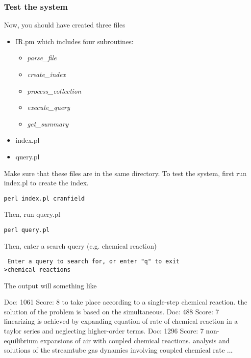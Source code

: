 \subsubsection{Test the system}

Now, you should have created three files
\begin{itemize}
  \item IR.pm which includes four subroutines:
  \begin{itemize}
    \item \emph{parse\_file}
    \item \emph{create\_index}
    \item \emph{process\_collection}
    \item \emph{execute\_query}
    \item \emph{get\_summary}
  \end{itemize}
  \item index.pl
  \item query.pl
\end{itemize}

Make sure that these files are in the same directory. To test the system, first run index.pl to create the index.

\begin{verbatim}
perl index.pl cranfield
\end{verbatim}

Then, run query.pl

\begin{verbatim}
perl query.pl
\end{verbatim}

Then, enter a search query (e.g. chemical reaction)

\begin{verbatim}
 Enter a query to search for, or enter "q" to exit
>chemical reactions
\end{verbatim}

The output will something like

\begin{boxedverbatim}

Doc: 1061   Score: 8
            to take place according to a single-step chemical reaction.
            the solution of the problem is based on the simultaneous.
Doc: 488    Score: 7
            linearizing is achieved by expanding equation of rate of chemical
            reaction in a taylor series and neglecting higher-order terms.
Doc: 1296   Score: 7
            non-equilibrium expansions of air with coupled chemical reactions.
            analysis and solutions of the streamtube gas dynamics involving
            coupled chemical rate
...
\end{boxedverbatim}
